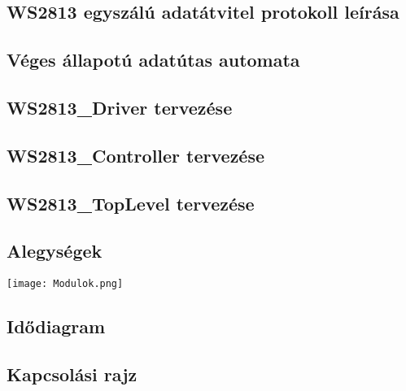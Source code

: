 \subsection{WS2813 egyszálú adatátvitel protokoll leírása}


\subsection{Véges állapotú adatútas automata}


\subsection{WS2813\_Driver tervezése}


\subsection{WS2813\_Controller tervezése}


\subsection{WS2813\_TopLevel tervezése}


\subsection{Alegységek}
\texttt{[image: Modulok.png]}

\subsection{Idődiagram}


\subsection{Kapcsolási rajz}
